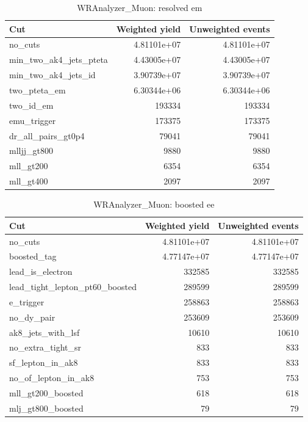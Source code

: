 \documentclass{article}
\begin{document}
\begin{table}[htbp]
\centering
\caption{WRAnalyzer\_Muon: resolved em}
\begin{tabular}{lrr}
\hline
Cut & Weighted yield & Unweighted events \\
\hline
no\_cuts & 4.81101e+07 & 4.81101e+07 \\
min\_two\_ak4\_jets\_pteta & 4.43005e+07 & 4.43005e+07 \\
min\_two\_ak4\_jets\_id & 3.90739e+07 & 3.90739e+07 \\
two\_pteta\_em & 6.30344e+06 & 6.30344e+06 \\
two\_id\_em & 193334 & 193334 \\
emu\_trigger & 173375 & 173375 \\
dr\_all\_pairs\_gt0p4 & 79041 & 79041 \\
mlljj\_gt800 & 9880 & 9880 \\
mll\_gt200 & 6354 & 6354 \\
mll\_gt400 & 2097 & 2097 \\
\hline
\end{tabular}
\end{table}

\begin{table}[htbp]
\centering
\caption{WRAnalyzer\_Muon: boosted ee}
\begin{tabular}{lrr}
\hline
Cut & Weighted yield & Unweighted events \\
\hline
no\_cuts & 4.81101e+07 & 4.81101e+07 \\
boosted\_tag & 4.77147e+07 & 4.77147e+07 \\
lead\_is\_electron & 332585 & 332585 \\
lead\_tight\_lepton\_pt60\_boosted & 289599 & 289599 \\
e\_trigger & 258863 & 258863 \\
no\_dy\_pair & 253609 & 253609 \\
ak8\_jets\_with\_lsf & 10610 & 10610 \\
no\_extra\_tight\_sr & 833 & 833 \\
sf\_lepton\_in\_ak8 & 833 & 833 \\
no\_of\_lepton\_in\_ak8 & 753 & 753 \\
mll\_gt200\_boosted & 618 & 618 \\
mlj\_gt800\_boosted & 79 & 79 \\
\hline
\end{tabular}
\end{table}
\end{document}
